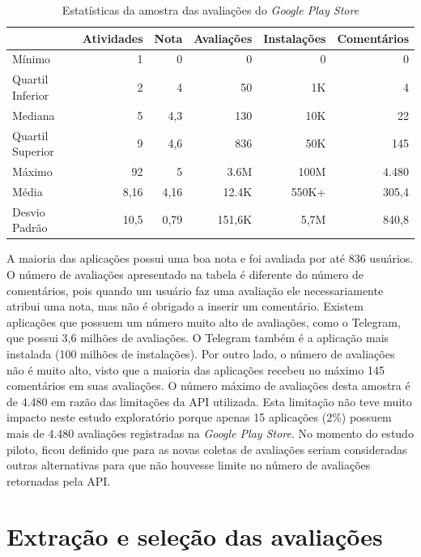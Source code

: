 \begin{table}[htb]

\centering
\caption{Estatísticas da amostra das avaliações do \textit{Google Play Store}}
\small
\label{tab:summarygps}
\begin{tabular}{lrrrrr}
\hline
             & Atividades & Nota & Avaliações     & Instalações  & Comentários \\
\hline
Mínimo          & 1          & 0     & 0            & 0         & 0       \\
Quartil Inferior           & 2          & 4           & 50    & 1K      & 4       \\
Mediana       & 5          & 4,3   & 130         & 10K     & 22      \\
Quartil Superior          & 9          & 4,6   & 836        & 50K     & 145     \\
Máximo          & 92         & 5     & 3.6M    & 100M & 4.480    \\
Média         & 8,16       & 4,16  & 12.4K     & 550K+    & 305,4   \\
Desvio Padrão        & 10,5       & 0,79  & 151,6K  & 5,7M   & 840,8  \\
\hline
\end{tabular}
\end{table}

A maioria das aplicações possui uma boa nota e foi avaliada por até 836 usuários. O número de avaliações apresentado na tabela é diferente do número de comentários, pois quando um usuário faz uma avaliação ele necessariamente atribui uma nota, mas não é obrigado a inserir um comentário. Existem aplicações que possuem um número muito alto de avaliações, como o Telegram, que possui 3,6 milhões de avaliações. O Telegram também é a aplicação mais instalada (100 milhões de instalações).
Por outro lado, o número de avaliações não é muito alto, visto que a maioria das aplicações recebeu no máximo 145 comentários em suas avaliações. O número máximo de avaliações desta amostra é de 4.480 em razão das limitações da API utilizada. Esta limitação não teve muito impacto neste estudo exploratório porque apenas 15 aplicações (2\%) possuem mais de 4.480 avaliações registradas na \textit{Google Play Store}. 
No momento do estudo piloto, ficou definido que para as novas coletas de avaliações seriam consideradas outras alternativas para que não houvesse limite no número de avaliações retornadas pela API. 


\section{Extração e seleção das avaliações}
\label{sec:extracaoselecao}

